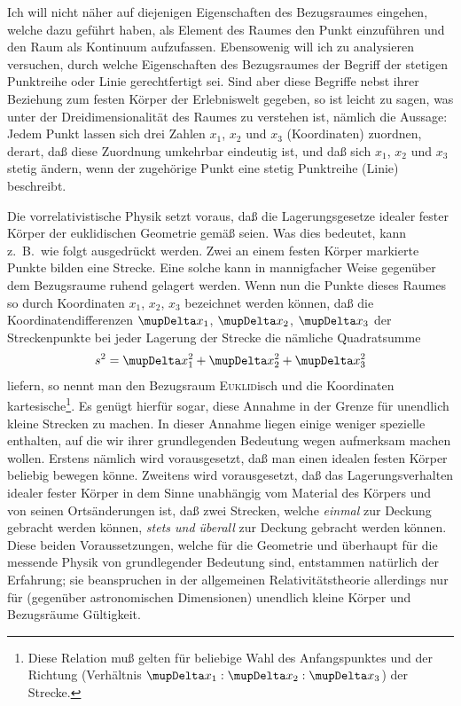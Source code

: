 Ich will nicht näher auf diejenigen Eigenschaften des Bezugsraumes eingehen, 
welche dazu geführt haben, als Element des Raumes den Punkt einzuführen und den 
Raum als Kontinuum aufzufassen. Ebensowenig will ich zu analysieren versuchen, 
durch welche Eigenschaften des Bezugsraumes der Begriff der stetigen Punktreihe 
oder Linie gerechtfertigt sei. Sind aber diese Begriffe nebst ihrer Beziehung 
zum festen Körper der Erlebniswelt gegeben, so ist leicht zu sagen, was unter 
der Dreidimensionalität des Raumes zu verstehen ist, nämlich die Aussage: Jedem 
Punkt lassen sich drei Zahlen $x_1$, $x_2$ und $x_3$ (Koordinaten) zuordnen, 
derart, daß diese Zuordnung umkehrbar eindeutig ist, und daß sich $x_1$, $x_2$ 
und $x_3$ stetig ändern, wenn der zugehörige Punkt eine stetig Punktreihe 
(Linie) beschreibt.

Die vorrelativistische Physik setzt voraus, daß die Lagerungsgesetze idealer 
fester Körper der euklidischen Geometrie gemäß seien. Was dies bedeutet, kann 
z.\ B.\ wie folgt ausgedrückt werden. Zwei an einem festen Körper markierte 
Punkte bilden eine Strecke. Eine solche kann in mannigfacher Weise gegenüber dem 
Bezugsraume ruhend gelagert werden. Wenn nun die Punkte dieses Raumes so durch 
Koordinaten $x_1$, $x_2$, $x_3$ bezeichnet werden können, daß die 
Koordinatendifferenzen $\Dva x_1$, $\Dva x_2$, $\Dva x_3$ der 
Streckenpunkte bei jeder Lagerung der Strecke die nämliche Quadratsumme
\begin{align}
	s^2 = \Dva x_1^2 + \Dva x_2^2 + \Dva x_3^2
	\label{eq:1}
\end{align}
liefern, so nennt man den Bezugsraum \textsc{Euklid}isch und die Koordinaten 
kartesische\footnote{Diese Relation muß gelten für beliebige Wahl des 
Anfangspunktes und der Richtung (Verhältnis $\Dva x_1 : \Dva x_2 : \Dva 
x_3$) der Strecke.}. Es genügt hierfür sogar, diese Annahme in der Grenze für 
unendlich kleine Strecken zu machen. In dieser Annahme liegen einige weniger 
spezielle enthalten, auf die wir ihrer grundlegenden Bedeutung wegen aufmerksam 
machen wollen. Erstens nämlich wird vorausgesetzt, daß man einen idealen festen 
Körper beliebig bewegen könne. Zweitens wird vorausgesetzt, daß das 
Lagerungsverhalten idealer fester Körper in dem Sinne unabhängig vom Material 
des Körpers und von seinen Ortsänderungen ist, daß zwei Strecken, welche 
\emph{einmal} zur Deckung gebracht werden können, \emph{stets und überall} zur 
Deckung gebracht werden können. Diese beiden Voraussetzungen, welche für die 
Geometrie und überhaupt für die messende Physik von grundlegender Bedeutung 
sind, entstammen natürlich der Erfahrung; sie beanspruchen in der allgemeinen 
Relativitätstheorie allerdings nur für (gegenüber astronomischen Dimensionen) 
unendlich kleine Körper und Bezugsräume Gültigkeit.

